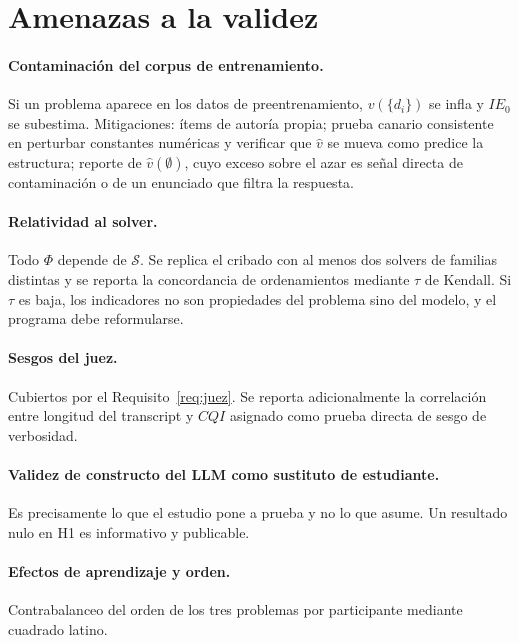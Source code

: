 \documentclass[11pt,a4paper]{article}
\theoremstyle{definition}
\theoremstyle{plain}
\theoremstyle{remark}
\newcommand{\solver}{\mathcal{S}}
\begin{document}
\section{Amenazas a la validez}\label{sec:amenazas}

\paragraph{Contaminación del corpus de entrenamiento.} Si un problema aparece en
los datos de preentrenamiento, $v(\{d_i\})$ se infla y $IE_0$ se subestima.
Mitigaciones: ítems de autoría propia; prueba canario consistente en perturbar
constantes numéricas y verificar que $\hat v$ se mueva como predice la estructura;
reporte de $\hat v(\emptyset)$, cuyo exceso sobre el azar es señal directa de
contaminación o de un enunciado que filtra la respuesta.

\paragraph{Relatividad al solver.} Todo $\Phi$ depende de $\solver$. Se replica el
cribado con al menos dos solvers de familias distintas y se reporta la
concordancia de ordenamientos mediante $\tau$ de Kendall. Si $\tau$ es baja, los
indicadores no son propiedades del problema sino del modelo, y el programa debe
reformularse.

\paragraph{Sesgos del juez.} Cubiertos por el Requisito~\ref{req:juez}. Se reporta
adicionalmente la correlación entre longitud del transcript y $CQI$ asignado como
prueba directa de sesgo de verbosidad.

\paragraph{Validez de constructo del LLM como sustituto de estudiante.} Es
precisamente lo que el estudio pone a prueba y no lo que asume. Un resultado nulo
en H1 es informativo y publicable.

\paragraph{Efectos de aprendizaje y orden.} Contrabalanceo del orden de los tres
problemas por participante mediante cuadrado latino.
\end{document}
